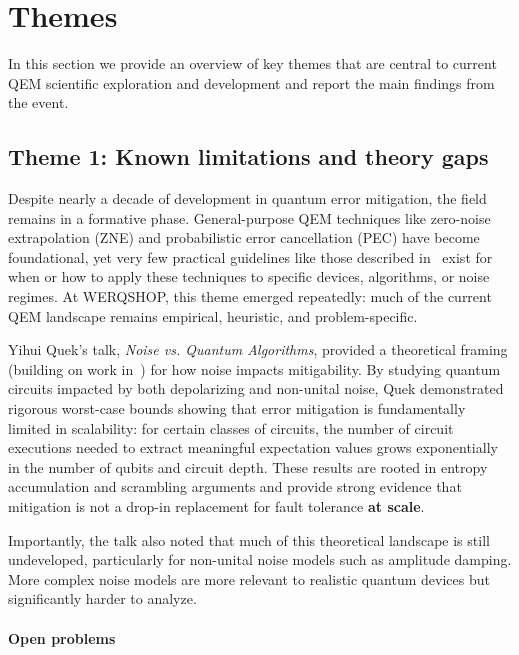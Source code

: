 \documentclass{article}
\begin{document}
\section{Themes}\label{sec:themes}
In this section we provide an overview of key themes that are central to current QEM scientific exploration and development and report the main findings from the event.

\subsection*{Theme 1: Known limitations and theory gaps}\label{sec:early}

Despite nearly a decade of development in quantum error mitigation, the field remains in a formative phase.
General-purpose QEM techniques like zero-noise extrapolation (ZNE) and probabilistic error cancellation (PEC) have become foundational, yet very few practical guidelines like those described in~\cite{wang2023} exist for when or how to apply these techniques to specific devices, algorithms, or noise regimes.
At WERQSHOP, this theme emerged repeatedly: much of the current QEM landscape remains empirical, heuristic, and problem-specific.

Yihui Quek's talk, \emph{Noise vs. Quantum Algorithms}, provided a theoretical framing (building on work in~\cite{Quek2024, quek2024-2}) for how noise impacts mitigability.
By studying quantum circuits impacted by both depolarizing and non-unital noise, Quek demonstrated rigorous worst-case bounds showing that error mitigation is fundamentally limited in scalability: for certain classes of circuits, the number of circuit executions needed to extract meaningful expectation values grows exponentially in the number of qubits and circuit depth.
These results are rooted in entropy accumulation and scrambling arguments and provide strong evidence that mitigation is not a drop-in replacement for fault tolerance \textbf{at scale}.

Importantly, the talk also noted that much of this theoretical landscape is still undeveloped, particularly for non-unital noise models such as amplitude damping.
More complex noise models are more relevant to realistic quantum devices but significantly harder to analyze.

\paragraph{Open problems}
\end{document}
